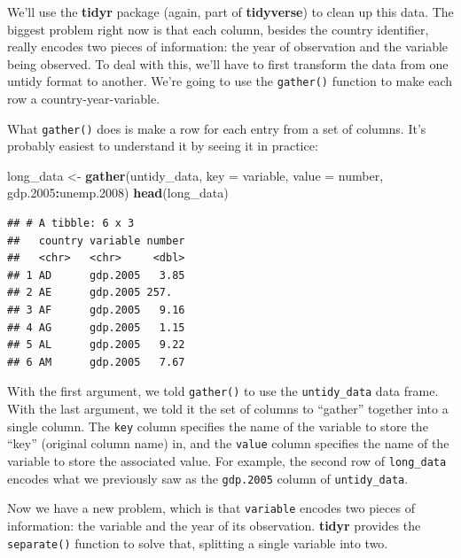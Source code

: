 \documentclass[
  12pt,
  oneside,openany]{book}
\newenvironment{Shaded}{\begin{snugshade}}{\end{snugshade}}
\newcommand{\DataTypeTok}[1]{\textcolor[rgb]{0.13,0.29,0.53}{#1}}
\newcommand{\FloatTok}[1]{\textcolor[rgb]{0.00,0.00,0.81}{#1}}
\newcommand{\KeywordTok}[1]{\textcolor[rgb]{0.13,0.29,0.53}{\textbf{#1}}}
\newcommand{\NormalTok}[1]{#1}
\newcommand{\OperatorTok}[1]{\textcolor[rgb]{0.81,0.36,0.00}{\textbf{#1}}}
\newcommand{\StringTok}[1]{\textcolor[rgb]{0.31,0.60,0.02}{#1}}
\begin{document}
We'll use the \textbf{tidyr} package (again, part of \textbf{tidyverse}) to clean up this data. The biggest problem right now is that each column, besides the country identifier, really encodes two pieces of information: the year of observation and the variable being observed. To deal with this, we'll have to first transform the data from one untidy format to another. We're going to use the \texttt{gather()} function to make each row a country-year-variable.

What \texttt{gather()} does is make a row for each entry from a set of columns. It's probably easiest to understand it by seeing it in practice:

\begin{Shaded}
\begin{Highlighting}[]
\NormalTok{long\_data <{-}}\StringTok{ }\KeywordTok{gather}\NormalTok{(untidy\_data,}
                    \DataTypeTok{key =}\NormalTok{ variable,}
                    \DataTypeTok{value =}\NormalTok{ number,}
\NormalTok{                    gdp}\FloatTok{.2005}\OperatorTok{:}\NormalTok{unemp}\FloatTok{.2008}\NormalTok{)}
\KeywordTok{head}\NormalTok{(long\_data)}
\end{Highlighting}
\end{Shaded}

\begin{verbatim}
## # A tibble: 6 x 3
##   country variable number
##   <chr>   <chr>     <dbl>
## 1 AD      gdp.2005   3.85
## 2 AE      gdp.2005 257.  
## 3 AF      gdp.2005   9.16
## 4 AG      gdp.2005   1.15
## 5 AL      gdp.2005   9.22
## 6 AM      gdp.2005   7.67
\end{verbatim}

With the first argument, we told \texttt{gather()} to use the \texttt{untidy\_data} data frame. With the last argument, we told it the set of columns to ``gather'' together into a single column. The \texttt{key} column specifies the name of the variable to store the ``key'' (original column name) in, and the \texttt{value} column specifies the name of the variable to store the associated value. For example, the second row of \texttt{long\_data} encodes what we previously saw as the \texttt{gdp.2005} column of \texttt{untidy\_data}.

Now we have a new problem, which is that \texttt{variable} encodes two pieces of information: the variable and the year of its observation. \textbf{tidyr} provides the \texttt{separate()} function to solve that, splitting a single variable into two.
\end{document}
